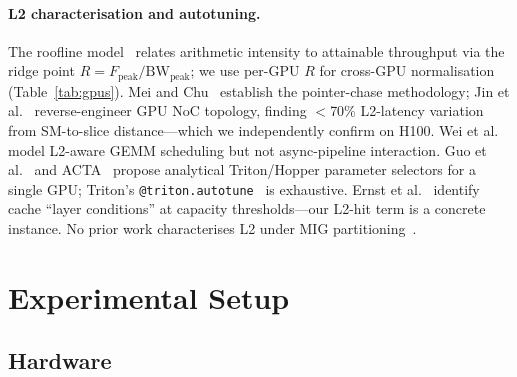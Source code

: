 \documentclass[10pt,twocolumn]{article}
\begin{document}
\paragraph{L2 characterisation and autotuning.}
The roofline model~\cite{roofline} relates arithmetic intensity to
attainable throughput via the ridge point $R = F_{\text{peak}} /
\text{BW}_{\text{peak}}$; we use per-GPU $R$ for cross-GPU
normalisation (Table~\ref{tab:gpus}).  Mei and
Chu~\cite{mei_dissecting} establish the pointer-chase methodology;
Jin et al.~\cite{gpu_noc} reverse-engineer GPU NoC topology,
finding $<$70\% L2-latency variation from SM-to-slice
distance---which we independently confirm on H100.  Wei et
al.~\cite{hytis} model L2-aware GEMM scheduling but not
async-pipeline interaction.  Guo et al.~\cite{tritonblas} and
ACTA~\cite{acta} propose analytical Triton/Hopper parameter
selectors for a single GPU; Triton's
\texttt{@triton.autotune}~\cite{triton} is exhaustive.  Ernst et
al.~\cite{layer_conditions} identify cache ``layer conditions'' at
capacity thresholds---our L2-hit term is a concrete instance.  No
prior work characterises L2 under MIG partitioning~\cite{mig_guide}.

\section{Experimental Setup}
\label{sec:setup}

\subsection{Hardware}
\end{document}
